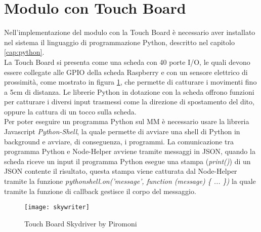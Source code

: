 \section{Modulo con Touch Board}\label{cap:touch}
Nell'implementazione del modulo con la Touch Board \`e necessario aver installato nel sistema
il linguaggio di programmazione Python, descritto nel capitolo \ref{cap:python}.\\
La Touch Board si presenta come una scheda con 40 porte I/O, le quali devono essere collegate alle
GPIO della scheda Raspberry e con un sensore elettrico di prossimit\`a, come mostrato in figura \ref{fig:TouchBoard}, che permette di catturare i movimenti fino a 5cm di distanza.
Le librerie Python in dotazione con la scheda offrono funzioni per catturare i diversi input trasmessi come
la direzione di spostamento del dito, oppure la cattura di un tocco sulla scheda.\\
Per poter eseguire un programma Python sul MM \`e necessario usare la libreria Javascript \emph{Python-Shell}, la quale
permette di avviare una shell di Python in background e avviare, di conseguenza, i programmi.
La comunicazione tra programma Python e Node-Helper avviene tramite messaggi in JSON, quando la scheda riceve un input
il programma Python esegue una stampa (\emph{print()}) di un JSON contente il risultato, questa stampa viene catturata dal
Node-Helper tramite la funzione \emph{pythonshell.on('message', function (message) \{ ... \})} la quale tramite la funzione di callback
gestisce il corpo del messaggio.

\begin{figure}[H]
    \texttt{[image: skywriter]}
    \caption{Touch Board Skydriver by Piromoni}
    \label{fig:TouchBoard}
\end{figure}
